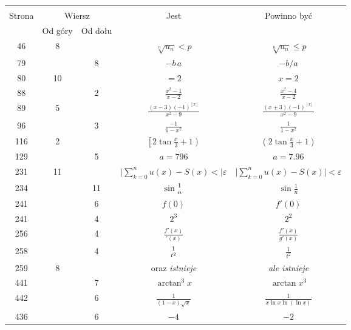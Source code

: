 \documentclass[a4paper,11pt]{article}
\numberwithin{equation}{section}
\begin{document}


\begin{center}

  \begin{tabular}{|c|c|c|c|c|}
    \hline
    & \multicolumn{2}{c|}{} & & \\
    Strona & \multicolumn{2}{c|}{Wiersz} & Jest
                              & Powinno być \\ \cline{2-3}
    & Od góry & Od dołu & & \\
    \hline
    46  &  8 & & $\sqrt[n]{ u_{ n } } < p$ & $\sqrt[n]{ u_{ n } } \leq p$ \\
    79  & &  8 & $-b \, a$ & $-b / a$ \\
    80  & 10 & & $= 2$ & $x = 2$ \\
    88  & &  2 & $\frac{ x^{ 2 } - 1 }{ x - 2 }$
           & $\frac{ x^{ 2 } - 4 }{ x - 2 }$ \\
    89  &  5 & & $\frac{ ( x - 3 )( -1 )^{ [ x ] } }{ x^{ 2 } - 9 }$
           & $\frac{ ( x + 3 )( -1 )^{ [ x ] } }{ x^{ 2 } - 9 }$ \\
    96  & &  3 & $\frac{ -1 }{ 1 - x^{ 2 } }$
           & $\frac{ 1 }{ 1 - x^{ 2 } }$ \\
    116 &  2 & & $\left[ 2 \tan \frac{ x }{ 3 } + 1 \right)$
           & $ \left( 2 \tan \frac{ x }{ 3 } + 1 \right)$ \\
    129 & &  5 & $a = 796$ & $a = 7.96$ \\
    231 & 11 & & $\bigg| \sum_{ k = 0 }^{ n } u( x ) - S( x ) < \bigg|
                 \varepsilon$
           & $\bigg| \sum_{ k = 0 }^{ n } u( x ) - S( x ) \bigg|
             < \varepsilon$ \\
    234 & & 11 & $\sin{ 1 \atop n }$ & $\sin \frac{ 1 }{ n }$ \\
    241 & &  6 & $f( 0 )$ & $f'( 0 )$ \\
    241 & &  4 & $2^{ 3 }$ & $2^{ 2 }$ \\
    256 & &  4 & $\frac{ f'( x ) }{ {}'( x ) }$
           & $\frac{ f'( x ) }{ g'( x ) }$ \\[0.4em]
    258 & &  4 & ${ 1 \atop t^{ 2 } }$ & $\frac{ 1 }{ t^{ 2 } }$ \\
    259 &  8 & & oraz \textit{istnieje} & \textit{ale istnieje} \\
    441 & &  7 & $\arctan^{ 3 }x$ & $\arctan x^{ 3 }$ \\
    442 & &  6 & $\frac{ 1 }{ ( 1 - x ) \sqrt{ x } }$
           & $\frac{ 1 }{ x \ln x \ln( \ln x ) }$ \\
    436 & &  6 & $-4$ & $-2$ \\
    \hline
  \end{tabular}

\end{center}
\end{document}
